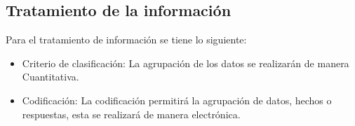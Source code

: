 \subsection{Tratamiento de la información}

Para el tratamiento de información se tiene lo siguiente:

\begin{itemize}
\item Criterio de clasificación: La agrupación de los datos se realizarán de manera Cuantitativa.

\item Codificación: La codificación permitirá la agrupación de datos, hechos o respuestas, esta se realizará de manera electrónica.
\end{itemize}

\newpage